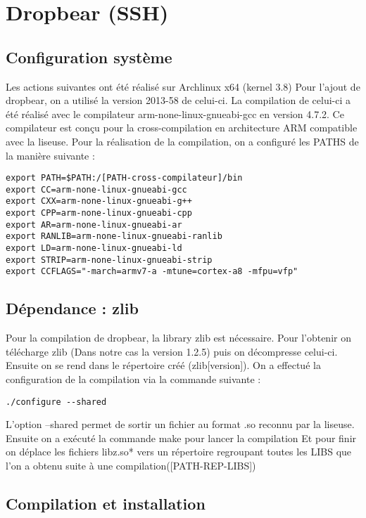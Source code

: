 \newpage   	
	
\section{Dropbear (SSH)}	

\subsection{Configuration système}

Les actions suivantes ont été réalisé sur Archlinux x64 (kernel 3.8)
Pour l'ajout de dropbear, on a utilisé la version 2013-58 de celui-ci. La compilation de celui-ci a été réalisé avec le compilateur arm-none-linux-gnueabi-gcc en version 4.7.2. Ce compilateur est conçu pour la cross-compilation en architecture ARM compatible avec la liseuse. 
Pour la réalisation de la compilation, on a configuré les PATHS de la manière suivante : 

\begin{lstlisting}
export PATH=$PATH:/[PATH-cross-compilateur]/bin
export CC=arm-none-linux-gnueabi-gcc
export CXX=arm-none-linux-gnueabi-g++
export CPP=arm-none-linux-gnueabi-cpp
export AR=arm-none-linux-gnueabi-ar
export RANLIB=arm-none-linux-gnueabi-ranlib
export LD=arm-none-linux-gnueabi-ld
export STRIP=arm-none-linux-gnueabi-strip
export CCFLAGS="-march=armv7-a -mtune=cortex-a8 -mfpu=vfp"
\end{lstlisting}

\subsection{Dépendance : zlib}
Pour la compilation de dropbear, la library zlib est nécessaire.
Pour l'obtenir on télécharge zlib (Dans notre cas la version 1.2.5) puis on décompresse celui-ci. Ensuite on se rend dans le répertoire créé (zlib[version]). On a effectué la configuration de la compilation via la commande suivante :

\begin{lstlisting}
./configure --shared
\end{lstlisting}

L'option --shared permet de sortir un fichier au format .so reconnu par la liseuse.
Ensuite on a exécuté la commande make pour lancer la compilation
Et pour finir on déplace les fichiers libz.so* vers un répertoire regroupant toutes les LIBS que l'on a obtenu suite à une compilation([PATH-REP-LIBS]) 

\subsection{Compilation et installation}
